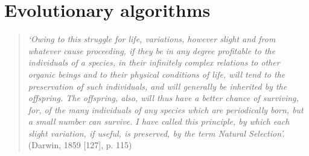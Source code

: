 





\chapter{Evolutionary algorithms}
\begin{quotation}
	\textit{‘Owing to this struggle for life, variations, however slight and from whatever cause proceeding, if they be in any degree profitable to the individuals of a species, in their infinitely complex relations to other organic beings and to their physical conditions of life, will tend to the preservation of such individuals, and will generally be inherited by the offspring. The offspring, also, will thus have a better chance of surviving, for, of the many individuals of any species which are periodically born, but a small number can survive. I have called this principle, by which each slight variation, if useful, is preserved, by the term Natural Selection’.} (Darwin, 1859 [127], p. 115)
\end{quotation}

